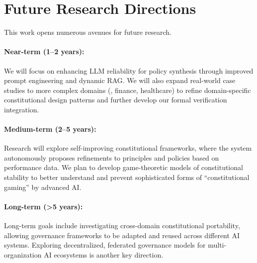 \section{Future Research Directions}\label{sec:future_work}
This work opens numerous avenues for future research.

\paragraph{Near-term (1--2 years):} We will focus on enhancing LLM reliability for policy synthesis through improved prompt engineering and dynamic RAG\@. We will also expand real-world case studies to more complex domains (\eg{}, finance, healthcare) to refine domain-specific constitutional design patterns and further develop our formal verification integration.

\paragraph{Medium-term (2--5 years):} Research will explore self-improving constitutional frameworks, where the system autonomously proposes refinements to principles and policies based on performance data. We plan to develop game-theoretic models of constitutional stability to better understand and prevent sophisticated forms of ``constitutional gaming'' by advanced AI\@.

\paragraph{Long-term (>5 years):} Long-term goals include investigating cross-domain constitutional portability, allowing governance frameworks to be adapted and reused across different AI systems. Exploring decentralized, federated governance models for multi-organization AI ecosystems is another key direction.

